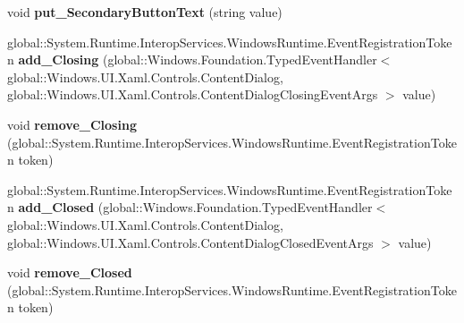 \begin{DoxyCompactItemize}
\item 
\mbox{\label{interface_windows_1_1_u_i_1_1_xaml_1_1_controls_1_1_i_content_dialog_af0c0753281acd52009a7c90aa0651582}} 
void {\bfseries put\+\_\+\+Secondary\+Button\+Text} (string value)
\item 
\mbox{\label{interface_windows_1_1_u_i_1_1_xaml_1_1_controls_1_1_i_content_dialog_a0c90eacfbf19a70c42e7827d75494527}} 
global\+::\+System.\+Runtime.\+Interop\+Services.\+Windows\+Runtime.\+Event\+Registration\+Token {\bfseries add\+\_\+\+Closing} (global\+::\+Windows.\+Foundation.\+Typed\+Event\+Handler$<$ global\+::\+Windows.\+U\+I.\+Xaml.\+Controls.\+Content\+Dialog, global\+::\+Windows.\+U\+I.\+Xaml.\+Controls.\+Content\+Dialog\+Closing\+Event\+Args $>$ value)
\item 
\mbox{\label{interface_windows_1_1_u_i_1_1_xaml_1_1_controls_1_1_i_content_dialog_a39db0b1822764cb6d5c7be9707a44c54}} 
void {\bfseries remove\+\_\+\+Closing} (global\+::\+System.\+Runtime.\+Interop\+Services.\+Windows\+Runtime.\+Event\+Registration\+Token token)
\item 
\mbox{\label{interface_windows_1_1_u_i_1_1_xaml_1_1_controls_1_1_i_content_dialog_a0beaba38f02c9d4794fb77352515c019}} 
global\+::\+System.\+Runtime.\+Interop\+Services.\+Windows\+Runtime.\+Event\+Registration\+Token {\bfseries add\+\_\+\+Closed} (global\+::\+Windows.\+Foundation.\+Typed\+Event\+Handler$<$ global\+::\+Windows.\+U\+I.\+Xaml.\+Controls.\+Content\+Dialog, global\+::\+Windows.\+U\+I.\+Xaml.\+Controls.\+Content\+Dialog\+Closed\+Event\+Args $>$ value)
\item 
\mbox{\label{interface_windows_1_1_u_i_1_1_xaml_1_1_controls_1_1_i_content_dialog_a0f292cccc855269673def1275049e487}} 
void {\bfseries remove\+\_\+\+Closed} (global\+::\+System.\+Runtime.\+Interop\+Services.\+Windows\+Runtime.\+Event\+Registration\+Token token)
\item 
\mbox{\label{interface_windows_1_1_u_i_1_1_xaml_1_1_controls_1_1_i_content_dialog_aab9c98aeae39301ee05dd02009bff07b}} 

\end{DoxyCompactItemize}
